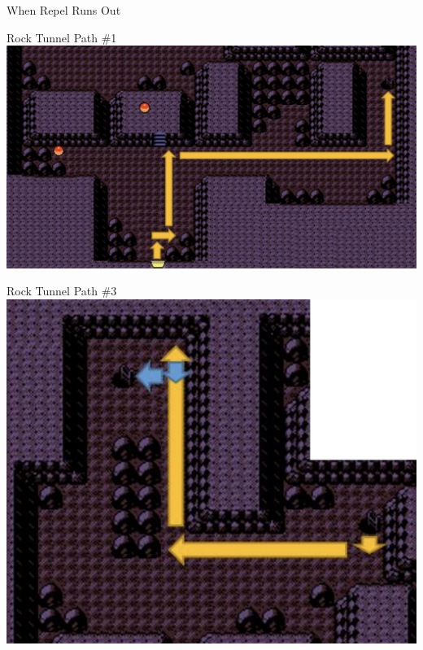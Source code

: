 \begin{paracol}{2}
\begin{menu}{When Repel Runs Out}
	\varwb
	\begin{packMenu}
		\item \superRepel
	\end{packMenu}
	\varwe
\end{menu}

\begin{story}{Rock Tunnel Path \#1}
	\varwb
	\includegraphics[scale=0.6]{../Graphics/19. Rock Tunnel 1.png}
	\varwe
\end{story}

\begin{story}{Rock Tunnel Path \#3}
	\varwb
	\includegraphics[scale=0.3]{../Graphics/21. Rock Tunnel 3.png}
	\varwe
\end{story}


\end{paracol}

